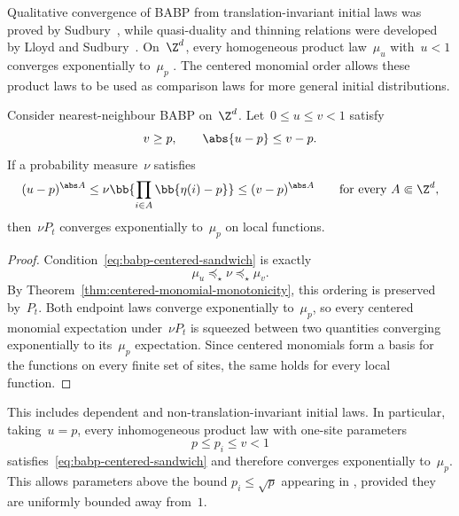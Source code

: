 
Qualitative convergence of BABP from translation-invariant initial laws was
proved by Sudbury~\cite{Sudbury1997}, while quasi-duality and thinning
relations were developed by Lloyd and Sudbury~\cite{LloydSudbury1997}.
On~$\Z^d$, every homogeneous product law~$\mu_u$ with~$u<1$ converges
exponentially to~$\mu_p$
\cite[Application~2 and Section~5.1.1]{MartinelliShapiraToninelli2025}.
The centered monomial order allows these product laws to be used as comparison
laws for more general initial distributions.

\begin{corollary}
\label{cor:babp-centered-convergence}
Consider nearest-neighbour BABP on~$\Z^d$. Let~$0\leq u\leq v<1$ satisfy
\begin{equation*}
v\geq p,
\qquad
\abs{u-p}\leq v-p.
\end{equation*}
If a probability measure~$\nu$ satisfies
\begin{equation}
\label{eq:babp-centered-sandwich}
(u-p)^{\abs A}
\leq
\nu\bb{\prod_{i\in A}\bb{\eta(i)-p}}
\leq
(v-p)^{\abs A}
\qquad
\text{for every }A\Subset\Z^d,
\end{equation}
then~$\nu P_t$ converges exponentially to~$\mu_p$ on local functions.
\end{corollary}

\begin{proof}
Condition~\eqref{eq:babp-centered-sandwich} is exactly
\begin{equation*}
\mu_u\preceq_\star\nu\preceq_\star\mu_v.
\end{equation*}
By Theorem~\ref{thm:centered-monomial-monotonicity}, this ordering is preserved
by~$P_t$. Both endpoint laws converge exponentially to~$\mu_p$, so every
centered monomial expectation under~$\nu P_t$ is squeezed between two
quantities converging exponentially to its~$\mu_p$ expectation. Since centered
monomials form a basis for the functions on every finite set of sites, the same
holds for every local function.
\end{proof}

This includes dependent and non-translation-invariant initial laws. In
particular, taking~$u=p$, every inhomogeneous product law with one-site
parameters
\begin{equation*}
p\leq p_i\leq v<1
\end{equation*}
satisfies~\eqref{eq:babp-centered-sandwich} and therefore converges
exponentially to~$\mu_p$. This allows parameters above the bound
$p_i\leq\sqrt p$ appearing in
\cite[Remark~5.5]{MartinelliShapiraToninelli2025}, provided they are uniformly
bounded away from~$1$.

